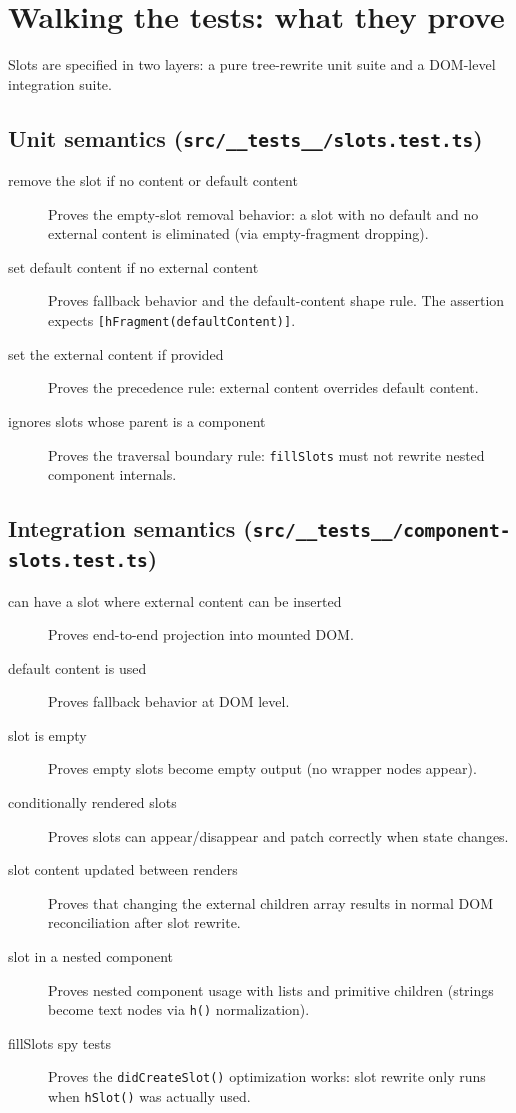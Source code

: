 \section{Walking the tests: what they prove}

Slots are specified in two layers: a pure tree-rewrite unit suite and a DOM-level integration suite.

\subsection{Unit semantics (\texttt{src/\_\_tests\_\_/slots.test.ts})}

\begin{description}
  \item[remove the slot if no content or default content] Proves the empty-slot removal behavior: a slot with no default and no external content is eliminated (via empty-fragment dropping).
  \item[set default content if no external content] Proves fallback behavior and the default-content shape rule. The assertion expects \texttt{[hFragment(defaultContent)]}.
  \item[set the external content if provided] Proves the precedence rule: external content overrides default content.
  \item[ignores slots whose parent is a component] Proves the traversal boundary rule: \texttt{fillSlots} must not rewrite nested component internals.
\end{description}

\subsection{Integration semantics (\texttt{src/\_\_tests\_\_/component-slots.test.ts})}

\begin{description}
  \item[can have a slot where external content can be inserted] Proves end-to-end projection into mounted DOM.
  \item[default content is used] Proves fallback behavior at DOM level.
  \item[slot is empty] Proves empty slots become empty output (no wrapper nodes appear).
  \item[conditionally rendered slots] Proves slots can appear/disappear and patch correctly when state changes.
  \item[slot content updated between renders] Proves that changing the external children array results in normal DOM reconciliation after slot rewrite.
  \item[slot in a nested component] Proves nested component usage with lists and primitive children (strings become text nodes via \texttt{h()} normalization).
  \item[fillSlots spy tests] Proves the \texttt{didCreateSlot()} optimization works: slot rewrite only runs when \texttt{hSlot()} was actually used.
\end{description}

